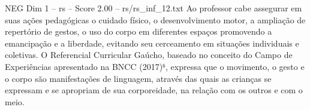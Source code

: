 \begin{textsample}{NEG Dim 1 – rs – Score 2.00 – rs/rs\_inf\_12.txt}
Ao professor cabe assegurar em suas ações pedagógicas o cuidado físico, o desenvolvimento motor, a ampliação de repertório de gestos, o uso do corpo em diferentes espaços promovendo a emancipação e a liberdade, evitando seu cerceamento em situações individuais e coletivas.
O Referencial Curricular Gaúcho, baseado no conceito do Campo de Experiências apresentado na BNCC (2017)⁶, expressa que o movimento, o gesto e o corpo são manifestações de linguagem, através das quais as crianças se expressam e se apropriam de sua corporeidade, na relação com os outros e com o meio.

\end{textsample}
